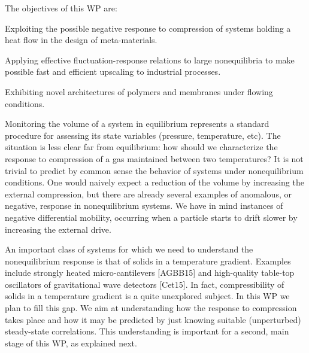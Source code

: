 \begin{workpackage}[id=WPcompress,wphases=0-48,
  short=Nonequilibrium compressibility, %
  title=Nonequilibrium compressibility, %
  lead=UNIPD,
  UNIPDRM=48]


\begin{wpobjectives}
  The objectives of this WP are:
  \begin{compactitem}
  \item Exploiting the possible negative response to compression of systems holding a heat flow in the design of meta-materials.
  \item Applying effective fluctuation-response relations to large nonequilibria to make possible fast and efficient upscaling to industrial processes.
  \item Exhibiting novel architectures of polymers and membranes under flowing conditions. 
  \end{compactitem}
\end{wpobjectives}

\begin{wpdescription}

Monitoring the volume of a system in equilibrium represents a standard procedure for assessing its state 
variables (pressure, temperature, etc).
The situation is less clear far from equilibrium: 
how should we characterize the response to compression of a gas maintained between two temperatures?
It is not trivial to predict by common sense the behavior of systems under nonequilibrium conditions. 
One would naively expect a reduction of the volume by increasing the external compression, but there are already 
several examples of anomalous, or negative, response in nonequilibrium systems.
We have in mind instances of negative differential mobility, occurring when a particle starts to drift 
slower by increasing the external drive.

An important class of systems for which we need to understand the nonequilibrium response is that of solids 
in a temperature gradient. Examples include strongly
heated micro-cantilevers [AGBB15] and high-quality table-top oscillators of gravitational wave detectors [Cet15].
In fact, compressibility of solids in a temperature gradient is a quite unexplored subject.
In this WP we plan to fill this gap.
We aim at  understanding how the response to compression takes place and how it
may be predicted by just knowing suitable (unperturbed) steady-state correlations.
This understanding is important for a second, main stage of this WP, as explained next.



\end{wpdescription}
\end{workpackage}
